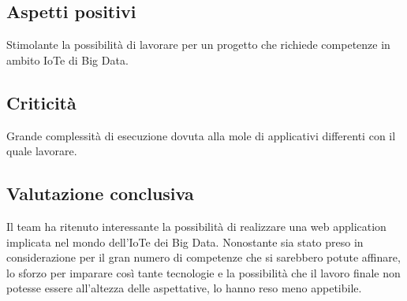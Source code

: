 \subsection{Aspetti positivi}
Stimolante la possibilità di lavorare per un progetto che richiede competenze in ambito IoT\glo e di Big Data\glos.


\subsection{Criticità}
Grande complessità di esecuzione dovuta alla mole di applicativi differenti con il quale lavorare.

\subsection{Valutazione conclusiva}
Il team ha ritenuto interessante la possibilità di realizzare una web application implicata nel mondo dell'IoT\glo e dei Big Data\glos. Nonostante sia stato preso in considerazione per il gran numero di competenze che si sarebbero potute affinare, lo sforzo per imparare così tante tecnologie e la possibilità che il lavoro finale non potesse essere all'altezza delle aspettative, lo hanno reso meno appetibile.
